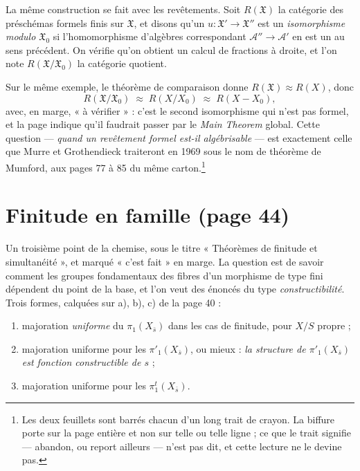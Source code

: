 \documentclass[11pt,a4paper]{article}
\begin{document}
La même construction se fait avec les revêtements. Soit $R(\mathfrak{X})$ la
catégorie des préschémas formels finis sur $\mathfrak{X}$, et disons qu'un
$u : \mathfrak{X}' \to \mathfrak{X}''$ est un \emph{isomorphisme modulo
$\mathfrak{X}_{0}$} si l'homomorphisme d'algèbres correspondant
$\mathcal{A}'' \to \mathcal{A}'$ en est un au sens précédent. On vérifie qu'on
obtient un calcul de fractions à droite, et l'on note
$R(\mathfrak{X}/\mathfrak{X}_{0})$ la catégorie quotient.

Sur le même exemple, le théorème de comparaison donne
$R(\mathfrak{X}) \approx R(X)$, donc
\[
  R(\mathfrak{X}/\mathfrak{X}_{0}) \;\approx\; R(X/X_{0}) \;\approx\;
  R(X - X_{0}) ,
\]
avec, en marge, « à vérifier » : c'est le second isomorphisme qui n'est pas
formel, et la page indique qu'il faudrait passer par le \emph{Main Theorem}
global. Cette question --- \emph{quand un revêtement formel est-il
algébrisable} --- est exactement celle que Murre et Grothendieck traiteront en
1969 sous le nom de théorème de Mumford, aux pages 77 à 85 du même
carton.\footnote{Les deux feuillets sont barrés chacun d'un long trait de
crayon. La biffure porte sur la page entière et non sur telle ou telle ligne ;
ce que le trait signifie --- abandon, ou report ailleurs --- n'est pas dit, et
cette lecture ne le devine pas.}

\section*{Finitude en famille (page 44)}

Un troisième point de la chemise, sous le titre « Théorèmes de finitude et
simultanéité », et marqué « c'est fait » en marge. La question est de savoir
comment les groupes fondamentaux des fibres d'un morphisme de type fini
dépendent du point de la base, et l'on veut des énoncés du type
\emph{constructibilité}. Trois formes, calquées sur a), b), c) de la page 40 :

\begin{enumerate}
  \item[a)] majoration \emph{uniforme} du $\pi_{1}(X_{\bar{s}})$ dans les cas
    de finitude, pour $X/S$ propre ;
  \item[b)] majoration uniforme pour les $\pi'_{1}(X_{\bar{s}})$, ou mieux :
    \emph{la structure de $\pi'_{1}(X_{\bar{s}})$ est fonction constructible de
    $s$} ;
  \item[c)] majoration uniforme pour les $\pi^{t}_{1}(X_{\bar{s}})$.
\end{enumerate}
\end{document}
